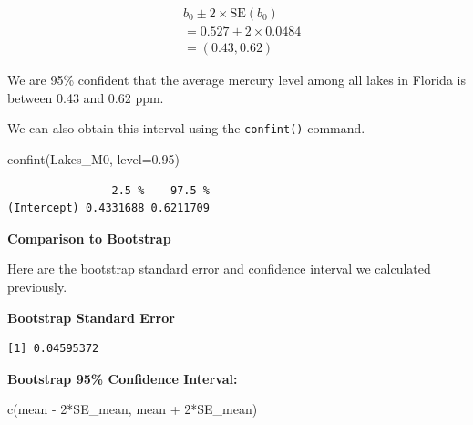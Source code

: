 \documentclass[
  letterpaper,
  DIV=11,
  numbers=noendperiod]{scrreprt}
\newenvironment{Shaded}{\begin{snugshade}}{\end{snugshade}}
\newcommand{\AttributeTok}[1]{\textcolor[rgb]{0.40,0.45,0.13}{#1}}
\newcommand{\DecValTok}[1]{\textcolor[rgb]{0.68,0.00,0.00}{#1}}
\newcommand{\FloatTok}[1]{\textcolor[rgb]{0.68,0.00,0.00}{#1}}
\newcommand{\FunctionTok}[1]{\textcolor[rgb]{0.28,0.35,0.67}{#1}}
\newcommand{\NormalTok}[1]{\textcolor[rgb]{0.00,0.23,0.31}{#1}}
\newcommand{\OtherTok}[1]{\textcolor[rgb]{0.00,0.23,0.31}{#1}}
\newcommand{\SpecialCharTok}[1]{\textcolor[rgb]{0.37,0.37,0.37}{#1}}
\begin{document}
\[
\begin{aligned}
& b_0 \pm 2\times\text{SE}(b_0) \\
& = 0.527 \pm 2\times{0.0484} \\
& = (0.43, 0.62)
\end{aligned}
\]

We are 95\% confident that the average mercury level among all lakes in
Florida is between 0.43 and 0.62 ppm.

We can also obtain this interval using the \texttt{confint()} command.

\begin{Shaded}
\begin{Highlighting}[]
\FunctionTok{confint}\NormalTok{(Lakes\_M0, }\AttributeTok{level=}\FloatTok{0.95}\NormalTok{)}
\end{Highlighting}
\end{Shaded}

\begin{verbatim}
                2.5 %    97.5 %
(Intercept) 0.4331688 0.6211709
\end{verbatim}

\textbf{Comparison to Bootstrap}

Here are the bootstrap standard error and confidence interval we
calculated previously.

\textbf{Bootstrap Standard Error}

\begin{Shaded}
\end{Shaded}

\begin{verbatim}
[1] 0.04595372
\end{verbatim}

\textbf{Bootstrap 95\% Confidence Interval:}

\begin{Shaded}
\begin{Highlighting}[]
\FunctionTok{c}\NormalTok{(mean }\SpecialCharTok{{-}} \DecValTok{2}\SpecialCharTok{*}\NormalTok{SE\_mean, mean }\SpecialCharTok{+} \DecValTok{2}\SpecialCharTok{*}\NormalTok{SE\_mean) }
\end{Highlighting}
\end{Shaded}
\end{document}
